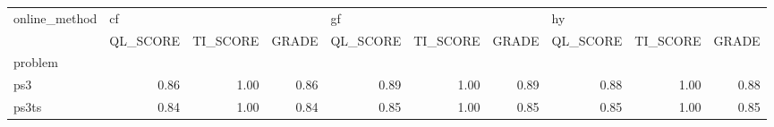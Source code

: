 \begin{tabular}{lrrrrrrrrr}
\toprule
online\_method & \multicolumn{3}{l}{cf} & \multicolumn{3}{l}{gf} & \multicolumn{3}{l}{hy} \\
{} & QL\_SCORE & TI\_SCORE & GRADE & QL\_SCORE & TI\_SCORE & GRADE & QL\_SCORE & TI\_SCORE & GRADE \\
problem &          &          &       &          &          &       &          &          &       \\
\midrule
ps3     &     0.86 &     1.00 &  0.86 &     0.89 &     1.00 &  0.89 &     0.88 &     1.00 &  0.88 \\
ps3ts   &     0.84 &     1.00 &  0.84 &     0.85 &     1.00 &  0.85 &     0.85 &     1.00 &  0.85 \\
\bottomrule
\end{tabular}
